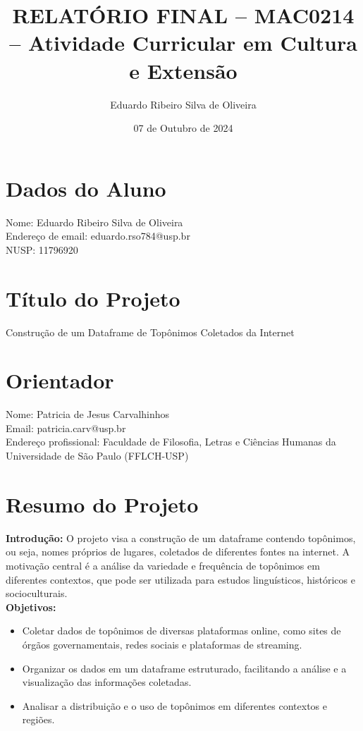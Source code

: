 \documentclass{article}
\title{RELATÓRIO FINAL – MAC0214 – Atividade Curricular em Cultura e Extensão}
\author{Eduardo Ribeiro Silva de Oliveira}
\date{07 de Outubro de 2024}
\begin{document}
\maketitle

\section*{Dados do Aluno}
Nome: Eduardo Ribeiro Silva de Oliveira\\
Endereço de email: eduardo.rso784@usp.br\\
NUSP: 11796920

\section*{Título do Projeto}
Construção de um Dataframe de Topônimos Coletados da Internet

\section*{Orientador}
Nome: Patricia de Jesus Carvalhinhos\\
Email: patricia.carv@usp.br\\
Endereço profissional: Faculdade de Filosofia, Letras e Ciências Humanas da Universidade de São Paulo (FFLCH-USP)

\section*{Resumo do Projeto}
\textbf{Introdução:} O projeto visa a construção de um dataframe contendo topônimos, ou seja, nomes próprios de lugares, coletados de diferentes fontes na internet. A motivação central é a análise da variedade e frequência de topônimos em diferentes contextos, que pode ser utilizada para estudos linguísticos, históricos e socioculturais.\\
\textbf{Objetivos:}
\begin{itemize}
    \item Coletar dados de topônimos de diversas plataformas online, como sites de órgãos governamentais, redes sociais e plataformas de streaming.
    \item Organizar os dados em um dataframe estruturado, facilitando a análise e a visualização das informações coletadas.
    \item Analisar a distribuição e o uso de topônimos em diferentes contextos e regiões.
\end{itemize}
\end{document}
